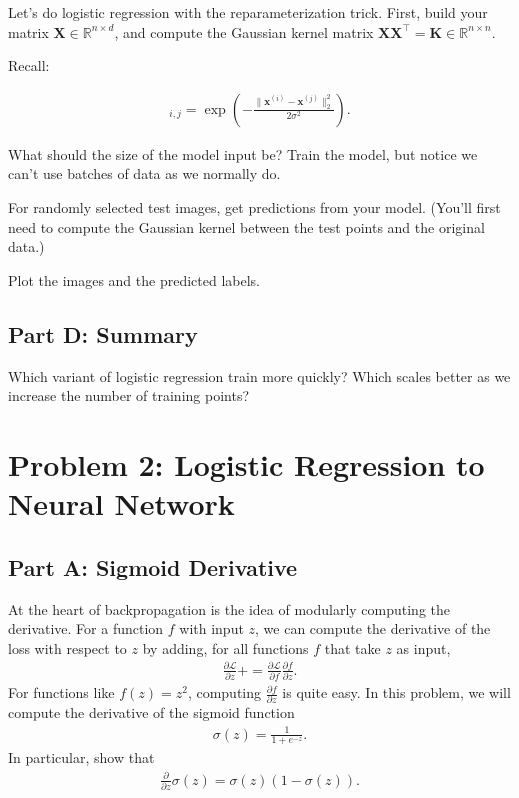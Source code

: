 \documentclass{article}
\begin{document}
Let's do logistic regression with the reparameterization trick.
First, build your matrix $\mathbf{X} \in \mathbb{R}^{n\times d}$, and compute the Gaussian kernel matrix $\mathbf{X X}^\top =\mathbf{K} \in \mathbb{R}^{n\times n}$.

Recall:

\begin{align}
    [\mathbf{K}]_{i,j} = \exp 
    \left(
    -\frac{\| \mathbf{x}^{(i)} - \mathbf{x}^{(j)}\|_2^2}{2\sigma^2}
    \right).
\end{align}

What should the size of the model input be?
Train the model, but notice we can't use batches of data as we normally do.

For randomly selected test images, get predictions from your model.
(You'll first need to compute the Gaussian kernel between the test points and the original data.)

Plot the images and the predicted labels.

\subsection*{Part D: Summary}

Which variant of logistic regression train more quickly?
Which scales better as we increase the number of training points?

%

\newpage
\section*{Problem 2: Logistic Regression to Neural Network}

\subsection*{Part A: Sigmoid Derivative}

At the heart of backpropagation is the idea of modularly computing the derivative.
For a function $f$ with input $z$, we can compute the derivative of the loss with respect to $z$ by adding, for all functions $f$ that take $z$ as input,
\begin{align}
    \frac{\partial \mathcal{L}}{\partial z} += 
    \frac{\partial \mathcal{L}}{\partial f}
    \frac{\partial f}{\partial z}.
\end{align}
For functions like $f(z) = z^2$, computing $\frac{\partial f}{\partial z}$ is quite easy.
In this problem, we will compute the derivative of the sigmoid function 
\begin{align}
  \sigma(z) = \frac1{1+e^{-z}}.
\end{align}
In particular, show that 
\begin{align}
    \frac{\partial }{\partial z}\sigma(z)
    = \sigma(z)(1-\sigma(z)).
\end{align}
\end{document}
